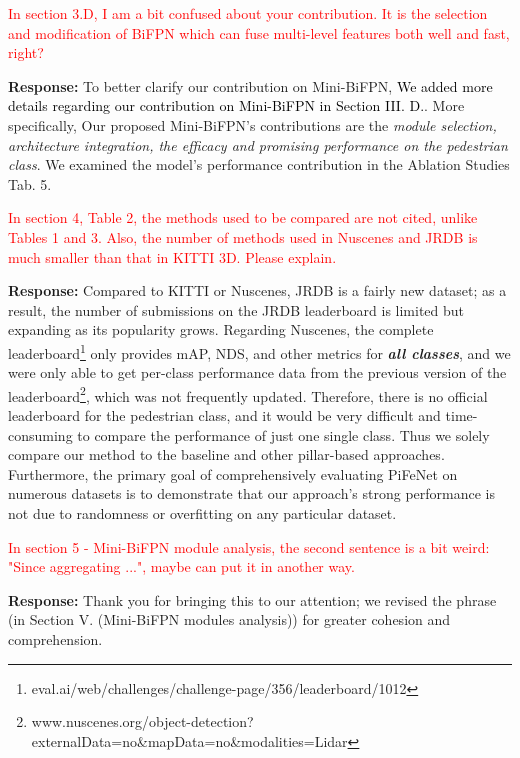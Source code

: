 \documentclass[11pt]{article}
\newcommand{\tho}[1]{\textcolor{black}{#1}}
\begin{document}
\textcolor{red}{In section 3.D, I am a bit confused about your contribution. It is the
selection and modification of BiFPN which can fuse multi-level features both
well and fast, right?} 

\textbf{Response:} To better clarify our contribution on Mini-BiFPN, \tho{We added more details regarding our contribution on Mini-BiFPN in Section III. D.}. More specifically, Our proposed Mini-BiFPN's contributions are the \textit{module selection, architecture integration, the efficacy and promising performance on the pedestrian class}. We examined the model's performance contribution in the Ablation Studies Tab. 5.


\textcolor{red}{In section 4, Table 2, the methods used to be compared are not cited, unlike
Tables 1 and 3. Also, the number of methods used in Nuscenes and JRDB is much
smaller than that in KITTI 3D. Please explain.} 

\textbf{Response:} Compared to KITTI\cite{geiger2013vision} or Nuscenes\cite{caesar2020nuscenes}, JRDB\cite{martin2021jrdb} is a fairly new dataset; as a result, the number of submissions on the JRDB leaderboard is limited but expanding as its popularity grows.
Regarding Nuscenes, the complete leaderboard\footnote{eval.ai/web/challenges/challenge-page/356/leaderboard/1012} only provides mAP, NDS, and other metrics for \textbf{\textit{all classes}}, and we were only able to get per-class performance data from the previous version of the leaderboard\footnote{www.nuscenes.org/object-detection?externalData=no\&mapData=no\&modalities=Lidar}, which was not frequently updated.
Therefore, there is no official leaderboard for the pedestrian class, and it would be very difficult and time-consuming to compare the performance of just one single class.
Thus we solely compare our method to the baseline and other pillar-based approaches. Furthermore, the primary goal of comprehensively evaluating PiFeNet on numerous datasets is to demonstrate that our approach's strong performance is not due to randomness or overfitting on any particular dataset. 

\textcolor{red}{In section 5 - Mini-BiFPN module analysis, the second sentence is a bit
weird: "Since aggregating ...", maybe can put it in another way.} 

\textbf{Response:} Thank you for bringing this to our attention; we revised the phrase (in Section V. (Mini-BiFPN modules analysis)) for greater cohesion and comprehension. 
\end{document}
